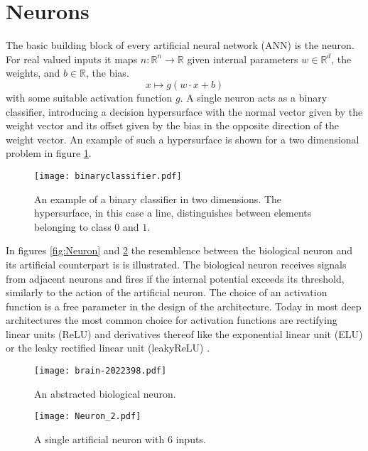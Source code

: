 \section{Neurons}
\label{sec:Neurons}
The basic building block of every artificial neural network (ANN) is the neuron. For real valued inputs it maps $n: \mathbb{R}^n \rightarrow \mathbb{R}$ given internal parameters $w \in \mathbb{R}^d$, the weights, and $b \in \mathbb{R}$, the bias.
\begin{equation}
x \mapsto g(w \cdot x + b)
\end{equation}
with some suitable activation function $g$. A single neuron acts as a binary classifier, introducing a decision hypersurface with the normal vector given by the weight vector and its offset given by the bias in the opposite direction of the weight vector. An example of such a hypersurface is shown for a two dimensional problem in figure \ref{fig:binaryclassifier}. \\

\begin{figure}[H]
\centering
  \texttt{[image: binaryclassifier.pdf]}
  \caption{An example of a binary classifier in two dimensions. The hypersurface, in this case a line, distinguishes between elements belonging to class $0$ and $1$.}
  \label{fig:binaryclassifier}
\end{figure}

In figures \ref{fig:Neuron}  and \ref{fig:ArtNeuron} the resemblence between the biological neuron and its artificial counterpart is is illustrated. The biological neuron receives signals from adjacent neurons and fires if the internal potential exceeds its threshold, similarly to the action of the artificial neuron.
The choice of an activation function is a free parameter in the design of the architecture. Today in most deep architectures the most common choice for activation functions are rectifying linear units (ReLU) and derivatives thereof like the exponential linear unit (ELU) \cite{Clevert2015} or the leaky rectified linear unit (leakyReLU) \cite{Maas2013}.

\begin{figure}[H]
\centering
  \texttt{[image: brain-2022398.pdf]}
  \caption{An abstracted biological neuron.}
  \label{fig:Neuron}
  \texttt{[image: Neuron\_2.pdf]}
  \caption{A single artificial neuron with $6$ inputs.}
  \label{fig:ArtNeuron}
\end{figure}



